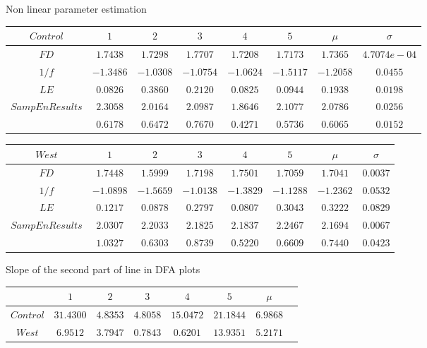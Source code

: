 \documentclass[t,12pt,english
\ifx\beamermode\undefined\else,\beamermode\fi
]{beamer}
\begin{document}
    
\begin{frame}{Non linear parameter estimation}

\begin{table}[!htbp]
\tiny
\centering
\begin{tabular}{ c c c c c c c c} 
\hline
$Control$&$1$&$2$&$3$&$4$&$5$&$\mu$&$\sigma$\\
\hline
$FD $&$1.7438$&$1.7298$&$1.7707$&$1.7208$&$1.7173$&$ 1.7365$&$ 4.7074e-04$\\
$1/f$&$-1.3486$&$-1.0308$&$-1.0754$&$-1.0624$&$-1.5117$&$-1.2058$&$ 0.0455$\\
$LE$&$0.0826$&$0.3860$&$0.2120$&$0.0825$&$0.0944$&$0.1938$&$0.0198$\\
$SampEnResults$&$2.3058$&$2.0164$&$2.0987$&$1.8646$&$2.1077$&$2.0786$&$0.0256$\\
&$0.6178$&$0.6472$&$0.7670$&$0.4271$&$0.5736$&$0.6065$&$0.0152$\\
\hline 
\end{tabular}
\end{table}



\begin{table}[!htbp]
\tiny
\centering
\begin{tabular}{ c c c c c c c c} 
\hline
$West$&$1$&$2$&$3$&$4$&$5$&$\mu$&$\sigma$\\
\hline
$FD$&$1.7448$&$1.5999$&$1.7198$&$1.7501$&$1.7059$&$ 1.7041$&$ 0.0037$\\
$1/f$&$-1.0898$&$-1.5659$&$-1.0138$&$-1.3829$&$-1.1288$&$-1.2362$&$ 0.0532$\\
$LE$&$0.1217$&$0.0878$&$0.2797$&$0.0807$&$0.3043$&$0.3222$&$0.0829$\\  
$SampEnResults$&$2.0307$&$2.2033$&$2.1825$&$2.1837$&$2.2467$&$2.1694$&$0.0067$\\
&$1.0327$&$0.6303$&$0.8739$&$0.5220$&$0.6609$&$ 0.7440$&$0.0423$\\
\hline 
\end{tabular}
\end{table}

\begin{table}[!htbp]
\tiny
\centering
\tiny Slope of the second part of line in DFA plots
\begin{tabular}{ c c c c c c c c} 
\hline
&$1$&$2$&$3$&$4$&$5$&$\mu$\\
\hline
$Control$&$31.4300$&$ 4.8353$&$4.8058$&$15.0472$&$21.1844$&$6.9868$\\
$West$&$6.9512$&$ 3.7947$&$0.7843$&$ 0.6201$&$13.9351$&$5.2171$\\
\hline 
\end{tabular}
\end{table}






\end{frame}
\end{document}
